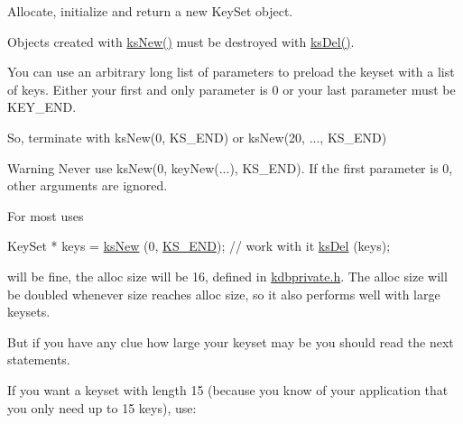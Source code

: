 Allocate, initialize and return a new Key\+Set object. 

Objects created with \hyperlink{group__keyset_ga671e1aaee3ae9dc13b4834a4ddbd2c3c}{ks\+New()} must be destroyed with \hyperlink{group__keyset_ga27e5c16473b02a422238c8d970db7ac8}{ks\+Del()}.

You can use an arbitrary long list of parameters to preload the keyset with a list of keys. Either your first and only parameter is 0 or your last parameter must be K\+E\+Y\+\_\+\+E\+ND.

So, terminate with ks\+New(0, K\+S\+\_\+\+E\+N\+D) or ks\+New(20, ..., K\+S\+\_\+\+E\+ND)

\begin{DoxyWarning}{Warning}
Never use ks\+New(0, key\+New(...), K\+S\+\_\+\+E\+ND). If the first parameter is 0, other arguments are ignored.
\end{DoxyWarning}
For most uses


\begin{DoxyCodeInclude}
KeySet * keys = \hyperlink{group__keyset_ga671e1aaee3ae9dc13b4834a4ddbd2c3c}{ksNew} (0, \hyperlink{kdbenum_8c_a7a28fce3773b2c873c94ac80b8b4cd54}{KS\_END});
\textcolor{comment}{// work with it}
\hyperlink{group__keyset_ga27e5c16473b02a422238c8d970db7ac8}{ksDel} (keys);
\end{DoxyCodeInclude}
 will be fine, the alloc size will be 16, defined in \hyperlink{kdbprivate_8h}{kdbprivate.\+h}. The alloc size will be doubled whenever size reaches alloc size, so it also performs well with large keysets.

But if you have any clue how large your keyset may be you should read the next statements.

If you want a keyset with length 15 (because you know of your application that you only need up to 15 keys), use\+:


